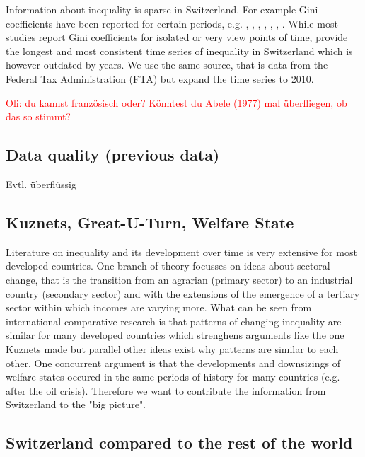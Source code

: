 \documentclass[twoside]{article}\usepackage[]{graphicx}\usepackage[]{color}
\begin{document}
\begin{multicols}{2}
Information about inequality is sparse in Switzerland. For example Gini coefficients have been reported for certain periods, e.g. \cite{Abele1977}, \cite{buhmann1988}, \cite{ernst1983wohlstandsverteilung}, \cite{foerster2005}, \cite{suter2002}, \cite{isengard2009umverteilung}, \cite{atkinson1995}. While most studies report Gini coefficients for isolated or very view points of time, \cite{Abele1977} provide the longest and most consistent time series of inequality in Switzerland which is however outdated by years. We use the same source, that is data from the Federal Tax Administration (FTA) but expand the time series to 2010. 

\textcolor{red}{Oli: du kannst französisch oder? Könntest du Abele (1977) mal überfliegen, ob das so stimmt?}

\subsection{Data quality (previous data)}

Evtl. überflüssig

\subsection{Kuznets, Great-U-Turn, Welfare State}

Literature on inequality and its development over time is very extensive for most developed countries. One branch of theory focusses on \cite{kuznets1955economic} ideas about sectoral change, that is the transition from an agrarian (primary sector) to an industrial country (secondary sector) and with the extensions of \cite{nielsen_kuznets_1997} the emergence of a tertiary sector within which incomes are varying more. What can be seen from international comparative research is that patterns of changing inequality are similar for many developed countries which strenghens arguments like the one Kuznets made but parallel other ideas exist why patterns are similar to each other. One concurrent argument is that the developments and downsizings of welfare states occured in the same periods of history for many countries (e.g. after the oil crisis). Therefore we want to contribute the information from Switzerland to the "big picture".
  
\subsection{Switzerland compared to the rest of the world}


\end{multicols}
\end{document}
